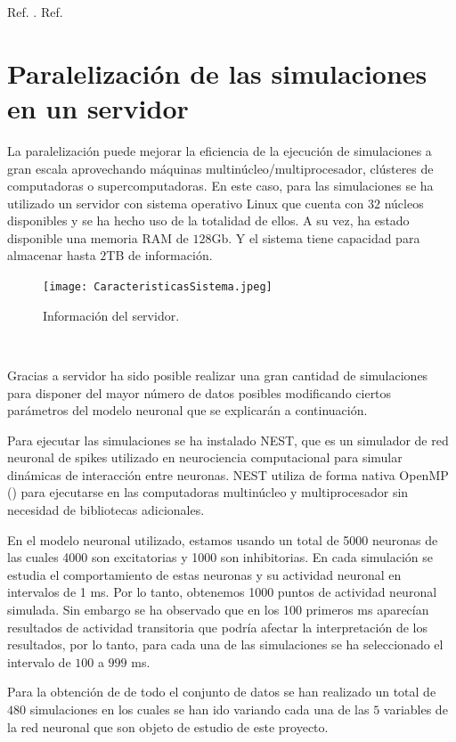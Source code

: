 \documentclass[oneside,openright,titlepage,numbers=noenddot,openany,headinclude,footinclude=true,
cleardoublepage=empty,abstractoff,BCOR=5mm,paper=a4,fontsize=12pt,main=spanish]{scrreprt}
\begin{document}
Ref. \cite{methodsforinferring}.
Ref. \cite{understanding}

\chapter{Paralelización de las simulaciones en un servidor}\label{part:simulaciones}

La paralelización puede mejorar la eficiencia de la ejecución de simulaciones a gran escala aprovechando máquinas multinúcleo/multiprocesador, clústeres de computadoras o supercomputadoras. En este caso, para las simulaciones se ha utilizado un servidor con sistema operativo Linux que cuenta con $32$ núcleos disponibles y se ha hecho uso de la totalidad de ellos. A su vez, ha estado disponible una memoria RAM de $128$Gb. Y el sistema tiene capacidad para almacenar hasta $2$TB de información.

\begin{figure}[h]
	\centering
	\texttt{[image: CaracteristicasSistema.jpeg]}
	\caption{Información del servidor.}
    \label{fig:distrnormal}
\end{figure}\

Gracias a servidor ha sido posible realizar una gran cantidad de simulaciones para disponer del mayor número de datos posibles modificando ciertos parámetros del modelo neuronal que se explicarán a continuación.

Para ejecutar las simulaciones se ha instalado NEST, que es un simulador de red neuronal de spikes utilizado en neurociencia computacional para simular dinámicas de interacción entre neuronas. NEST utiliza de forma nativa OpenMP (\cite{openMP}) para ejecutarse en las computadoras multinúcleo y multiprocesador sin necesidad de bibliotecas adicionales.

En el modelo neuronal utilizado, estamos usando un total de 5000 neuronas de las cuales 4000 son excitatorias y 1000 son inhibitorias. En cada simulación se estudia el comportamiento de estas neuronas y su actividad neuronal en intervalos de 1 ms. Por lo tanto, obtenemos 1000 puntos de actividad neuronal simulada. Sin embargo se ha observado que en los 100 primeros ms aparecían resultados de actividad transitoria que podría afectar la interpretación de los resultados, por lo tanto, para cada una de las simulaciones se ha seleccionado el intervalo de $100$ a $999$ ms.

Para la obtención de de todo el conjunto de datos se han realizado un total de $480$ simulaciones en los cuales se han ido variando cada una de las $5$ variables de la red neuronal que son objeto de estudio de este proyecto.
\end{document}
